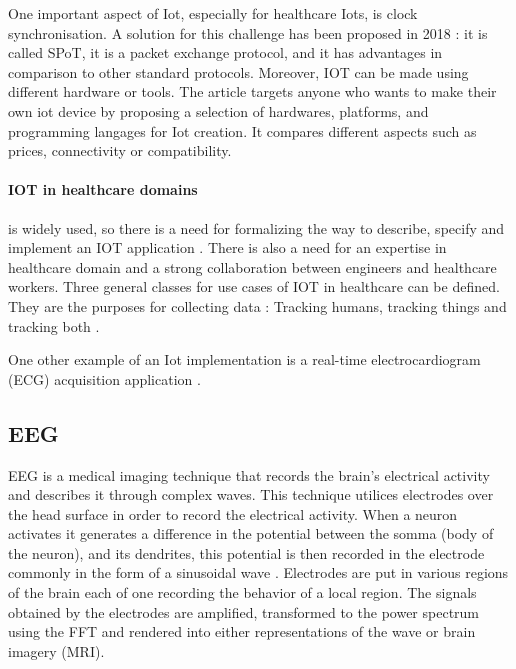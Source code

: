      One important aspect of Iot, especially for healthcare Iots, is clock synchronisation. 
      A solution for this challenge has been proposed in 2018 \cite{clockIot}:
      it is called SPoT, it is a packet exchange protocol, and it has advantages in comparison to other standard protocols. 
      Moreover, IOT can be made using different hardware or tools. The article \cite{yourOwnIot} targets anyone 
        who wants to make their own iot device by proposing a selection of           
        hardwares, platforms, and programming langages for Iot creation. 
        It compares different aspects such as prices, connectivity or compatibility.

      \paragraph{IOT in healthcare domains } is widely used, so there is a need for
        formalizing the way to describe, specify and implement an IOT application \cite{buildingIot}. 
        There is also a need for an expertise in healthcare domain and  
        a strong collaboration between engineers and healthcare workers.
     Three general classes for use cases of IOT in healthcare can be defined. They are the purposes for  
      collecting data : Tracking humans, tracking things and tracking both \cite{buildingIot}.
        
  
   One other example of an Iot implementation is a real-time electrocardiogram (ECG) acquisition application \cite{ecgIot}.






\subsection{EEG}

EEG is a medical imaging technique that records the brain’s electrical activity and describes it through complex waves.  This technique utilices electrodes over the head surface in order to record the electrical activity. When a neuron activates it generates a difference in the potential between the somma (body of the neuron), and its dendrites, this potential is then recorded in the electrode commonly in the form of a sinusoidal wave \cite{EEGfundamentals}. Electrodes are put in various regions of the brain each of one recording the behavior of a local region. The signals obtained by the electrodes are amplified, transformed to the power spectrum using the FFT and rendered into either representations of the wave or brain imagery (MRI).

